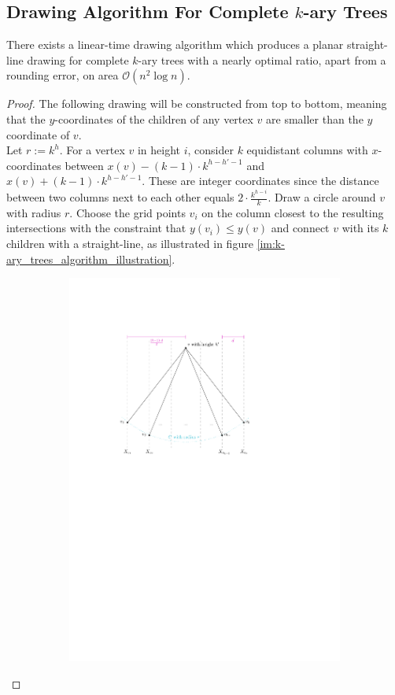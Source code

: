 \subsection{Drawing Algorithm For Complete $k$-ary Trees}


\begin{theorem}
	There exists a linear-time drawing algorithm which produces a planar straight-line drawing for complete $k$-ary trees with a nearly optimal ratio, apart from a rounding error, on area $\mathcal{O}(n^2\log n)$.
\end{theorem}
\begin{proof}
	The following drawing will be constructed from top to bottom, meaning that the $y$-coordinates of the children of any vertex $v$ are smaller than the $y$ coordinate of $v$.\\
	Let $r := k^h$. For a vertex $v$ in height $i$, consider $k$ equidistant columns with $x$-coordinates between $x(v) - (k-1)\cdot  k^{h-h'-1}$ and $x(v) + (k-1)\cdot  k^{h-h'-1}$. These are integer coordinates since the distance between two columns next to each other equals $2\cdot \frac{k^{h-i}}{k}$. Draw a circle around $v$ with radius $r$. Choose the grid points $v_i$ on the column closest to the resulting intersections with the constraint that $y(v_i) \leq y(v)$ and connect $v$ with its $k$ children with a straight-line, as illustrated in figure \ref{im:k-ary_trees_algorithm_illustration}. 
\begin{figure}[H]
	\centering
		\begin{subfigure}{\textwidth}
			\centering
			\includegraphics[page=1,width=0.6\linewidth]{graphics/k-ary_tree_algorithm_construction.pdf}

\end{subfigure}
\end{figure}
\end{proof}
